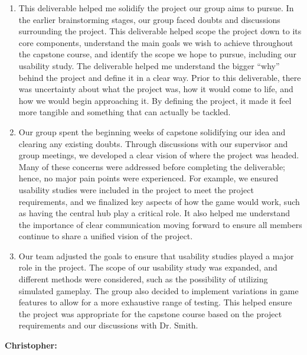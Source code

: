 \documentclass{article}
\begin{document}
\begin{enumerate}
	\item This deliverable helped me solidify the project our group aims to pursue. In the earlier 
	brainstorming stages, our group faced doubts and discussions surrounding the project. This deliverable 
	helped scope the project down to its core components, understand the main goals we wish to achieve 
	throughout the capstone course, and identify the scope we hope to pursue, including our usability study. 
	The deliverable helped me understand the bigger ``why'' behind the project and define it in a clear way. 
	Prior to this deliverable, there was uncertainty about what the project was, how it would come to life, and how 
	we would begin approaching it. By defining the project, it made it feel more tangible and something that can actually be tackled. 
	\item Our group spent the beginning weeks of capstone solidifying our idea and clearing any existing doubts. Through 
	discussions with our supervisor and group meetings, we developed a clear vision of where the project was headed. Many of 
	these concerns were addressed before completing the deliverable; hence, no major pain points were experienced. For example, 
	we ensured usability studies were included in the project to meet the project requirements, and we finalized key aspects of 
	how the game would work, such as having the central hub play a critical role. It also helped me understand the importance of 
	clear communication moving forward to ensure all members continue to share a unified vision of the project.
	\item Our team adjusted the goals to ensure that usability studies played a major role in the project. The scope of our 
	usability study was expanded, and different methods were considered, such as the possibility of utilizing simulated 
	gameplay. The group also decided to implement variations in game features to allow for a more exhaustive range of 
	testing. This helped ensure the project was appropriate for the capstone course based on the project requirements 
	and our discussions with Dr. Smith.
\end{enumerate}

\noindent \textbf{Christopher:}
\end{document}
